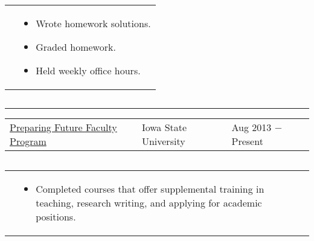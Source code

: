 \documentclass{article}
\newcommand{\q}{$\quad$ \newline}
\newcommand{\vl}{4.25}
\newcommand{\wl}{8.4}
\newcommand{\ww}{13}
\newcommand{\myrule}{\noindent \rule{\textwidth}{1pt}}
\begin{document}
\noindent \begin{tabular}{@{}p{\vl cm}p{\ww cm}@{}}
& \begin{itemize}
\item Wrote homework solutions. 
\item Graded homework. 
\item Held weekly office hours.
\end{itemize}
\end{tabular} \q 






\myrule


\noindent \begin{tabular}{@{}p{\vl cm}p{\wl cm}l@{}}
\href{http://www.celt.iastate.edu/pff/}{Preparing Future Faculty Program} & Iowa State University & Aug 2013 $-$ Present
\end{tabular} \q 
 
\noindent \begin{tabular}{@{}p{\vl cm}p{\ww cm}@{}}
& \begin{itemize}
\item Completed courses that offer supplemental training in teaching, research writing, and applying for academic positions. 
\end{itemize}
\end{tabular} \q 
 
\end{document}
